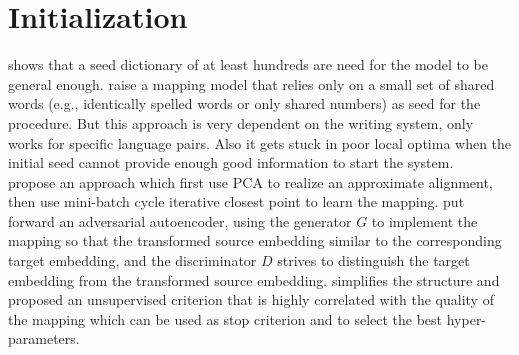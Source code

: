 \section{Initialization}
 \cite{vulic2016role} shows that a seed dictionary of at least hundreds are need for the model to be general enough. \cite{artetxe2017learning} raise a mapping model that relies only on a small set of shared words (e.g., identically spelled words or only shared numbers) as seed for the procedure. But this approach is very dependent on the writing system, only works for specific language pairs. Also it gets stuck in poor local optima when the initial seed cannot provide enough good information to start the system.\\
  \cite{DBLP:journals/corr/abs-1801-06126}
 propose an approach which first use PCA to realize an approximate alignment, then use mini-batch cycle iterative closest point to learn the mapping.  
\cite{zhang2017adversarial} put forward an adversarial autoencoder, using the generator $G$ to implement the mapping so that the transformed source embedding similar to the corresponding target embedding, and the discriminator $D$ strives to distinguish the target embedding from the transformed source embedding. \cite{conneau2017word} simplifies the structure and proposed an unsupervised criterion that is highly correlated with the quality of the mapping which can be used as stop criterion and to select the best hyper-parameters.
%
%
%
%


